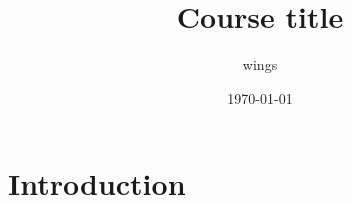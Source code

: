 \documentclass{article}
\title{Course title}
\author{wings }
\date{\today}
\begin{document}
\maketitle

\section{Introduction}
\end{document}
